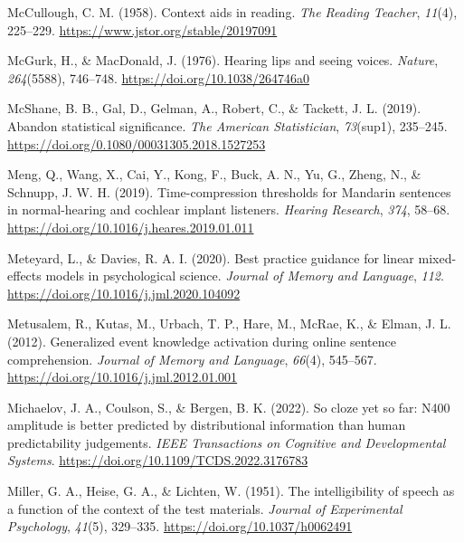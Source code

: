 \documentclass[a4paper, nobind]{templates/ociamthesis}
\newlength{\cslhangindent}
\newenvironment{CSLReferences}[2] %
 {%
  \setlength{\parindent}{0pt}
  \ifodd #1
  \let\oldpar\par
  \def\par{\hangindent=\cslhangindent\oldpar}
  \fi
  \setlength{\parskip}{1mm}
  \setlength{\baselineskip}{6mm}
 }%
 {}
\begin{document}
\begin{CSLReferences}{1}{0}
\leavevmode{}%
McCullough, C. M. (1958). {Context aids in reading}. \emph{The Reading Teacher}, \emph{11}(4), 225--229. \url{https://www.jstor.org/stable/20197091}

\leavevmode{}%
McGurk, H., \& MacDonald, J. (1976). Hearing lips and seeing voices. \emph{Nature}, \emph{264}(5588), 746--748. \url{https://doi.org/10.1038/264746a0}

\leavevmode{}%
McShane, B. B., Gal, D., Gelman, A., Robert, C., \& Tackett, J. L. (2019). Abandon statistical significance. \emph{The American Statistician}, \emph{73}(sup1), 235--245. \url{https://doi.org/0.1080/00031305.2018.1527253}

\leavevmode{}%
Meng, Q., Wang, X., Cai, Y., Kong, F., Buck, A. N., Yu, G., Zheng, N., \& Schnupp, J. W. H. (2019). {Time-compression thresholds for Mandarin sentences in normal-hearing and cochlear implant listeners}. \emph{Hearing Research}, \emph{374}, 58--68. \url{https://doi.org/10.1016/j.heares.2019.01.011}

\leavevmode{}%
Meteyard, L., \& Davies, R. A. I. (2020). {Best practice guidance for linear mixed-effects models in psychological science}. \emph{Journal of Memory and Language}, \emph{112}. \url{https://doi.org/10.1016/j.jml.2020.104092}

\leavevmode{}%
Metusalem, R., Kutas, M., Urbach, T. P., Hare, M., McRae, K., \& Elman, J. L. (2012). Generalized event knowledge activation during online sentence comprehension. \emph{Journal of Memory and Language}, \emph{66}(4), 545--567. \url{https://doi.org/10.1016/j.jml.2012.01.001}

\leavevmode{}%
Michaelov, J. A., Coulson, S., \& Bergen, B. K. (2022). So cloze yet so far: N400 amplitude is better predicted by distributional information than human predictability judgements. \emph{IEEE Transactions on Cognitive and Developmental Systems}. \url{https://doi.org/10.1109/TCDS.2022.3176783}

\leavevmode{}%
Miller, G. A., Heise, G. A., \& Lichten, W. (1951). {The intelligibility of speech as a function of the context of the test materials}. \emph{Journal of Experimental Psychology}, \emph{41}(5), 329--335. \url{https://doi.org/10.1037/h0062491}


\end{CSLReferences}
\end{document}
